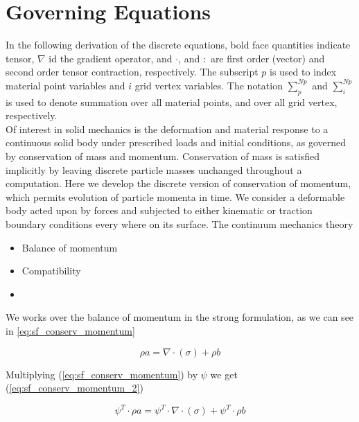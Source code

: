 
\section{Governing Equations}
\label{sec:deriv_eq}

In  the following  derivation  of the  discrete  equations, bold  face
quantities  indicate tensor,  $\nabla$ id  the gradient  operator, and
$\cdot$,  and $:$  are first  order (vector)  and second  order tensor
contraction, respectively. The subscript $p$ is used to index material
point  variables   and  $i$   grid  vertex  variables.   The  notation
$\sum_p^{Np}$ and $\sum_i^{Np}$  is used to denote  summation over all
material points, and over all grid vertex, respectively.\\

Of  interest  in  solid  mechanics is  the  deformation  and  material
response to a continuous solid  body under prescribed loads and initial
conditions,    as   governed    by    conservation    of   mass    and
momentum.  Conservation of  mass  is satisfied  implicitly by  leaving
discrete particle  masses unchanged throughout a  computation. Here we
develop  the  discrete  version  of conservation  of  momentum,  which
permits  evolution  of  particle  momenta   in  time.  We  consider  a
deformable body acted upon by forces and subjected to either kinematic
or  traction  boundary conditions  every  where  on its  surface.  The
continuum mechanics theory

\begin{itemize}
\item Balance of momentum
\item Compatibility
\item
\end{itemize}

 
We works over the balance of momentum in the strong formulation, as we
can see in \ref{eq:sf_conserv_momentum}

\begin{equation}
  \label{eq:sf_conserv_momentum}
  \rho a = \nabla \cdot(\sigma) + \rho b  
\end{equation}

Multiplying (\ref{eq:sf_conserv_momentum}) by $\psi$ we get
(\ref{eq:sf_conserv_momentum_2})

\begin{equation}
  \label{eq:sf_conserv_momentum_2}
  \psi^T \cdot \rho a = \psi^T \cdot \nabla\cdot(\sigma) + \psi^T \cdot \rho b
\end{equation}

